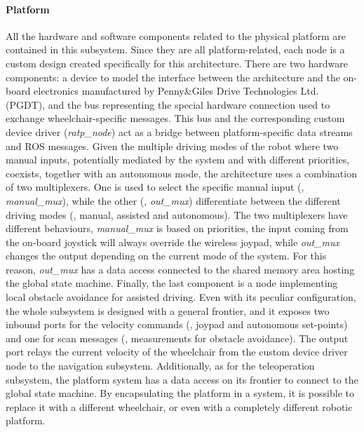 \paragraph{Platform} All the hardware and software components related to the physical platform are contained in this subsystem. Since they are all platform-related, each node is a custom design created specifically for this architecture. There are two hardware components: a device to model the interface between the architecture and the on-board electronics manufactured by Penny\&Giles Drive Technologies Ltd. (PGDT), and the bus representing the special hardware connection used to exchange wheelchair-specific messages. This bus and the corresponding custom device driver (\textit{ratp\_node}) act as a bridge between platform-specific data streams and ROS messages. Given the multiple driving modes of the robot where two manual inputs, potentially mediated by the system and with different priorities, coexists, together with an autonomous mode, the architecture uses a combination of two multiplexers. One is used to select the specific manual input (\ie, \textit{manual\_mux}), while the other (\ie, \textit{out\_mux}) differentiate between the different driving modes (\ie, manual, assisted and autonomous). The two multiplexers have different behaviours, \textit{manual\_mux} is based on priorities, the input coming from the on-board joystick will always override the wireless joypad, while \textit{out\_mux} changes the output depending on the current mode of the system. For this reason, \textit{out\_mux} has a data access connected to the shared memory area hosting the global state machine. Finally, the last component is a node implementing local obstacle avoidance for assisted driving. Even with its peculiar configuration, the whole subsystem is designed with a general frontier, and it exposes two inbound ports for the velocity commands (\ie, joypad and autonomous set-points) and one for scan messages (\ie, measurements for obstacle avoidance). The output port relays the current velocity of the wheelchair from the custom device driver node to the navigation subsystem. Additionally, as for the teleoperation subsystem, the platform system has a data access on its frontier to connect to the global state machine. By encapsulating the platform in a system, it is possible to replace it with a different wheelchair, or even with a completely different robotic platform.

